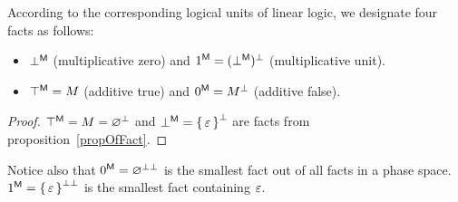 \begin{proposition} 
According to the corresponding logical units of linear logic, we designate four facts as follows:
\begin{itemize}
\item ${\bot}^{\sf M}$ (multiplicative zero) and  ${\mbox{\boldmath{1}}}^{\sf M} = {({\bot}^{\sf M})^{\bot}} $ (multiplicative unit).
\item $ {\top}^{\sf M} = M$ (additive true) and ${\mbox{\boldmath{0}}}^{\sf M} = {{M}^{\bot}}$ (additive false). 
\end{itemize}
\end{proposition}
\begin{proof}
${\top}^{\sf M} = M = {{\varnothing}^{\bot}}$ and ${\bot}^{\sf M} = {{\set{\varepsilon}}^{\bot}}$ are facts from proposition~\ref{propOfFact}.
\end{proof}
%
Notice also that ${\mbox{\boldmath{0}}}^{\sf M} = {{\varnothing}^{\bot\bot}}$ is the smallest fact 
out of all facts in a phase space.
${\mbox{\boldmath{1}}}^{\sf M} = {{\set{\varepsilon}}^{\bot\bot}}$ is the smallest fact containing $\varepsilon$. 


